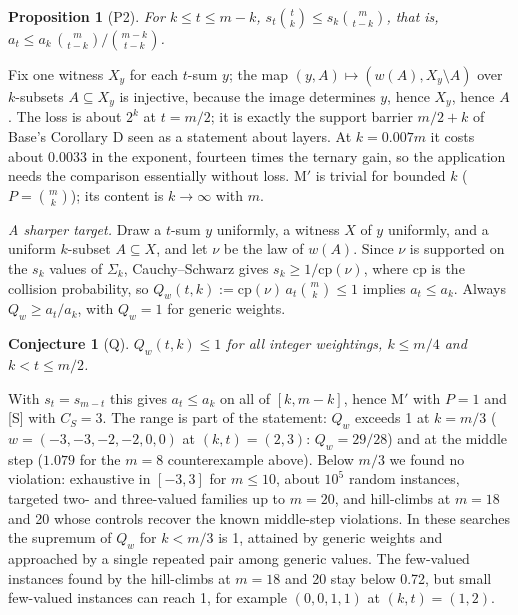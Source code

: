 \documentclass[11pt]{article}
\theoremstyle{plain}
\newtheorem{proposition}{Proposition}
\newtheorem{conjecture}{Conjecture}
\begin{document}
\begin{proposition}[P2]\label{prop:p2}
For $k \le t \le m - k$, $s_t\binom{t}{k} \le s_k\binom{m}{t-k}$, that is, $a_t \le a_k\,\binom{m}{t-k}\big/\binom{m-k}{t-k}$.
\end{proposition}
Fix one witness $X_y$ for each $t$-sum $y$; the map $(y, A) \mapsto (w(A), X_y \setminus A)$ over $k$-subsets $A \subseteq X_y$ is injective, because the image determines $y$, hence $X_y$, hence $A$. The loss is about $2^k$ at $t = m/2$; it is exactly the support barrier $m/2 + k$ of Base's Corollary D seen as a statement about layers. At $k = 0.007m$ it costs about $0.0033$ in the exponent, fourteen times the ternary gain, so the application needs the comparison essentially without loss. M$'$ is trivial for bounded $k$ ($P = \binom{m}{k}$); its content is $k \to \infty$ with $m$.

\emph{A sharper target.} Draw a $t$-sum $y$ uniformly, a witness $X$ of $y$ uniformly, and a uniform $k$-subset $A \subseteq X$, and let $\nu$ be the law of $w(A)$. Since $\nu$ is supported on the $s_k$ values of $\Sigma_k$, Cauchy--Schwarz gives $s_k \ge 1/\mathrm{cp}(\nu)$, where $\mathrm{cp}$ is the collision probability, so $Q_w(t,k) := \mathrm{cp}(\nu)\, a_t \binom{m}{k} \le 1$ implies $a_t \le a_k$. Always $Q_w \ge a_t/a_k$, with $Q_w = 1$ for generic weights.

\begin{conjecture}[Q]\label{conj:Q}
$Q_w(t,k) \le 1$ for all integer weightings, $k \le m/4$ and $k < t \le m/2$.
\end{conjecture}
With $s_t = s_{m-t}$ this gives $a_t \le a_k$ on all of $[k, m-k]$, hence M$'$ with $P = 1$ and [S] with $C_S = 3$. The range is part of the statement: $Q_w$ exceeds 1 at $k = m/3$ ($w = (-3,-3,-2,-2,0,0)$ at $(k,t) = (2,3)$: $Q_w = 29/28$) and at the middle step ($1.079$ for the $m = 8$ counterexample above). Below $m/3$ we found no violation: exhaustive in $[-3,3]$ for $m \le 10$, about $10^5$ random instances, targeted two- and three-valued families up to $m = 20$, and hill-climbs at $m = 18$ and 20 whose controls recover the known middle-step violations. In these searches the supremum of $Q_w$ for $k < m/3$ is 1, attained by generic weights and approached by a single repeated pair among generic values. The few-valued instances found by the hill-climbs at $m = 18$ and 20 stay below 0.72, but small few-valued instances can reach 1, for example $(0,0,1,1)$ at $(k,t) = (1,2)$.
\end{document}
